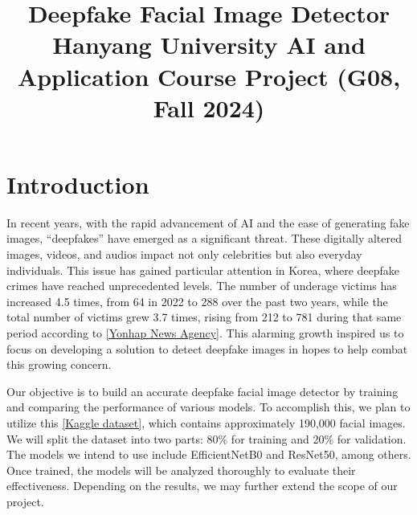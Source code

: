\documentclass[conference]{IEEEtran}
\begin{document}
\title{Deepfake Facial Image Detector\\
{\large Hanyang University AI and Application Course Project (G08, Fall 2024)}}

\author{
\and
{}
\and
{}
\and
{}
}


\maketitle

\section*{Introduction}
In recent years, with the rapid advancement of AI and the ease of generating fake images, “deepfakes” have emerged as a significant threat. These digitally altered images, videos, and audios impact not only celebrities but also everyday individuals. This issue has gained particular attention in Korea, where deepfake crimes have reached unprecedented levels. The number of underage victims has increased 4.5 times, from 64 in 2022 to 288 over the past two years, while the total number of victims grew 3.7 times, rising from 212 to 781 during that same period according to \href{https://en.yna.co.kr/view/AEN20240828003100315}{[Yonhap News Agency]}. This alarming growth inspired us to focus on developing a solution to detect deepfake images in hopes to help combat this growing concern.

Our objective is to build an accurate deepfake facial image detector by training and comparing the performance of various models. To accomplish this, we plan to utilize this \href{https://www.kaggle.com/datasets/manjilkarki/deepfake-and-real-images}{[Kaggle dataset]}, which contains approximately 190,000 facial images. We will split the dataset into two parts: 80\% for training and 20\% for validation. The models we intend to use include EfficientNetB0 and ResNet50, among others. Once trained, the models will be analyzed thoroughly to evaluate their effectiveness. Depending on the results, we may further extend the scope of our project.
\end{document}
